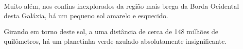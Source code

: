 \documentclass{article}
\begin{document}
  Muito além, nos confins inexplorados da região mais brega da
  Borda Ocidental desta Galáxia, há um pequeno sol amarelo e esquecido.

  Girando em torno deste sol, a uma distância de cerca de 148 milhões de
  quilômetros, há um planetinha verde-azulado absolutamente insignificante.
\end{document}
